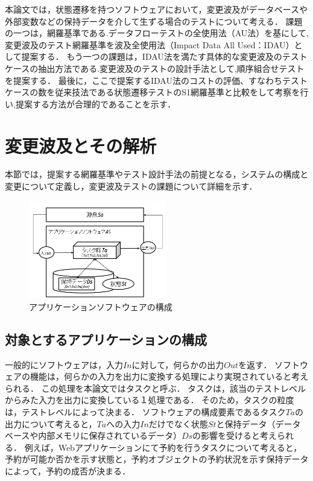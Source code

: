 \documentclass[a4paper,11pt]{jreport}
\begin{document}
本論文では，状態遷移を持つソフトウェアにおいて，変更波及がデータベースや外部変数などの保持データを介して生ずる場合のテストについて考える．
課題の一つは，網羅基準である.データフローテストの全使用法（AU法）\cite{beiz90}を基にして,変更波及のテスト網羅基準を波及全使用法（Impact Data All Used：IDAU）として提案する．
もう一つの課題は，IDAU法を満たす具体的な変更波及のテストケースの抽出方法である.変更波及のテストの設計手法として,順序組合せテストを提案する．
最後に，ここで提案するIDAU法のコストの評価、すなわちテストケースの数を従来技法である状態遷移テストのS1網羅基準と比較をして考察を行い,提案する方法が合理的であることを示す．



\section{変更波及とその解析}
本節では，提案する網羅基準やテスト設計手法の前提となる，システムの構成と変更について定義し，変更波及テストの課題について詳細を示す．

\begin{figure}[t]
  \begin{center}
  \includegraphics[width=6cm]{./image/fig-1.png}
  \caption{アプリケーションソフトウェアの構成}
  \label{fig:fig-1}
  \end{center}
\end{figure}

\subsection{対象とするアプリケーションの構成}
一般的にソフトウェアは，入力$In$に対して，何らかの出力$Out$を返す．
ソフトウェアの機能は，何らかの入力を出力に変換する処理により実現されていると考えられる．
この処理を本論文ではタスクと呼ぶ．
タスクは，該当のテストレベルからみた入力を出力に変換している１処理である．
そのため，タスクの粒度は，テストレベルによって決まる．%
ソフトウェアの構成要素であるタスク$Ta$の出力について考えると，$Ta$への入力$In$だけでなく状態$St$と保持データ（データベースや内部メモリに保存されているデータ）$Ds$の影響を受けると考えられる．
例えば，Webアプリケーションにて予約を行うタスクについて考えると，予約が可能か否かを示す状態と，予約オブジェクトの予約状況を示す保持データによって，予約の成否が決まる．
\end{document}
